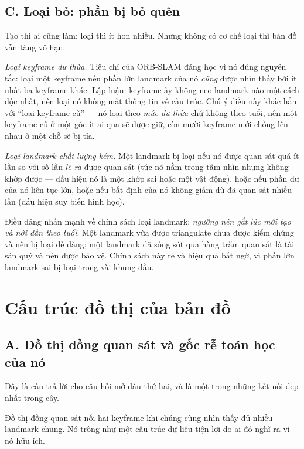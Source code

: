 \documentclass[../../vslam.tex]{subfiles}
\begin{document}
\subsection{C. Loại bỏ: phần bị bỏ quên}

Tạo thì ai cũng làm; loại thì ít hơn nhiều. Nhưng không có cơ chế loại thì bản đồ vẫn tăng vô hạn.

\emph{Loại keyframe dư thừa.} Tiêu chí của ORB-SLAM \cite{murartal2015orbslam} đáng học vì nó đúng nguyên tắc: loại một keyframe nếu phần lớn landmark của nó \emph{cũng} được nhìn thấy bởi ít nhất ba keyframe khác. Lập luận: keyframe ấy không neo landmark nào một cách độc nhất, nên loại nó không mất thông tin về cấu trúc. Chú ý điều này khác hẳn với ``loại keyframe cũ'' --- nó loại theo \emph{mức dư thừa} chứ không theo tuổi, nên một keyframe cũ ở một góc ít ai qua sẽ được giữ, còn mười keyframe mới chồng lên nhau ở một chỗ sẽ bị tỉa.

\emph{Loại landmark chất lượng kém.} Một landmark bị loại nếu nó được quan sát quá ít lần so với số lần \emph{lẽ ra} được quan sát (tức nó nằm trong tầm nhìn nhưng không khớp được --- dấu hiệu nó là một khớp sai hoặc một vật động), hoặc nếu phần dư của nó liên tục lớn, hoặc nếu bất định của nó không giảm dù đã quan sát nhiều lần (dấu hiệu suy biến hình học).

Điều đáng nhấn mạnh về chính sách loại landmark: \emph{ngưỡng nên gắt lúc mới tạo và nới dần theo tuổi}. Một landmark vừa được triangulate chưa được kiểm chứng và nên bị loại dễ dàng; một landmark đã sống sót qua hàng trăm quan sát là tài sản quý và nên được bảo vệ. Chính sách này rẻ và hiệu quả bất ngờ, vì phần lớn landmark sai bị loại trong vài khung đầu.

\section{Cấu trúc đồ thị của bản đồ}

\subsection{A. Đồ thị đồng quan sát và gốc rễ toán học của nó}

Đây là câu trả lời cho câu hỏi mở đầu thứ hai, và là một trong những kết nối đẹp nhất trong cây.

Đồ thị đồng quan sát nối hai keyframe khi chúng cùng nhìn thấy đủ nhiều landmark chung. Nó trông như một cấu trúc dữ liệu tiện lợi do ai đó nghĩ ra vì nó hữu ích.
\end{document}
